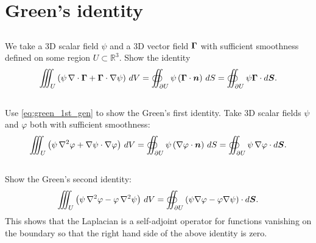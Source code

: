 \documentclass[11pt,letterpaper]{report}
\begin{document}
\section{Green's identity}
\subsection{}
We take a 3D scalar field $\psi$ and a 3D vector field $\boldsymbol{\Gamma}$ with sufficient smoothness defined on some region $U \subset \mathbb{R}^3$. Show the identity
\begin{align}
    \iiint_U \left( \psi \, \nabla \cdot \boldsymbol{\Gamma} + \boldsymbol{\Gamma} \cdot \nabla \psi\right)\, dV  = \oiint_{\partial U} \psi \left( \boldsymbol{\Gamma} \cdot \boldsymbol{n} \right)\, dS=\oiint_{\partial U}\psi\boldsymbol{\Gamma}\cdot d\boldsymbol{S}.\label{eq:green_1st_gen}
\end{align}

\subsection{}
Use \eqref{eq:green_1st_gen} to show the Green's first identity. Take 3D scalar fields $\psi$ and $\varphi$ both with sufficient smoothness:
\begin{align}
    \iiint_U \left( \psi \, \nabla^2 \varphi + \nabla \psi \cdot \nabla \varphi \right)\, dV  = \oiint_{\partial U} \psi \left( \nabla \varphi \cdot \boldsymbol{n} \right)\, dS=\oiint_{\partial U}\psi\,\nabla\varphi\cdot d\boldsymbol{S}.
\end{align}

\subsection{}
Show the Green's second identity:
\begin{align}
    \iiint_U \left( \psi \, \nabla^2 \varphi - \varphi \, \nabla^2 \psi\right)\, dV = \oiint_{\partial U} \left( \psi \nabla \varphi - \varphi \nabla \psi\right)\cdot d\boldsymbol{S}.
\end{align}
This shows that the Laplacian is a self-adjoint operator for functions vanishing on the boundary so that the right hand side of the above identity is zero.


\end{document}
